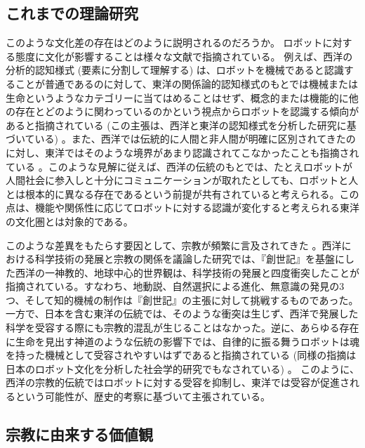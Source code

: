 \documentclass[a4j,12pt]{jreport}
\begin{document}
\subsection{これまでの理論研究}
このような文化差の存在はどのように説明されるのだろうか。
ロボットに対する態度に文化が影響することは様々な文献で指摘されている。
例えば、西洋の分析的認知様式 (要素に分割して理解する) は、ロボットを機械であると認識することが普通であるのに対して、東洋の関係論的認知様式のもとでは機械または生命というようなカテゴリーに当てはめることはせず、概念的または機能的に他の存在とどのように関わっているのかという視点からロボットを認識する傾向があると指摘されている\cite{mania} (この主張は、西洋と東洋の認知様式を分析した研究\cite{bunseki}に基づいている) 。また、西洋では伝統的に人間と非人間が明確に区別されてきたのに対し、東洋ではそのような境界があまり認識されてこなかったことも指摘されている\cite{mania} 。このような見解に従えば、西洋の伝統のもとでは、たとえロボットが人間社会に参入しと十分にコミュニケーションが取れたとしても、ロボットと人とは根本的に異なる存在であるという前提が共有されていると考えられる。この点は、機能や関係性に応じてロボットに対する認識が変化すると考えられる東洋の文化圏とは対象的である。


このような差異をもたらす要因として、宗教が頻繁に言及されてきた\cite{mania, social, gygi} 。西洋における科学技術の発展と宗教の関係を議論した研究\cite{four}では、『創世記』を基盤にした西洋の一神教的、地球中心的世界観は、科学技術の発展と四度衝突したことが指摘されている。すなわち、地動説、自然選択による進化、無意識の発見の3つ、そして知的機械の制作は『創世記』の主張に対して挑戦するものであった。一方で、日本を含む東洋の伝統では、そのような衝突は生じず、西洋で発展した科学を受容する際にも宗教的混乱が生じることはなかった。逆に、あらゆる存在に生命を見出す神道のような伝統の影響下では、自律的に振る舞うロボットは魂を持った機械として受容されやすいはずであると指摘されている (同様の指摘は日本のロボット文化を分析した社会学的研究\cite{gygi}でもなされている) 。
このように、西洋の宗教的伝統ではロボットに対する受容を抑制し、東洋では受容が促進されるという可能性が、歴史的考察に基づいて主張されている。


\subsection{宗教に由来する価値観}
\end{document}
